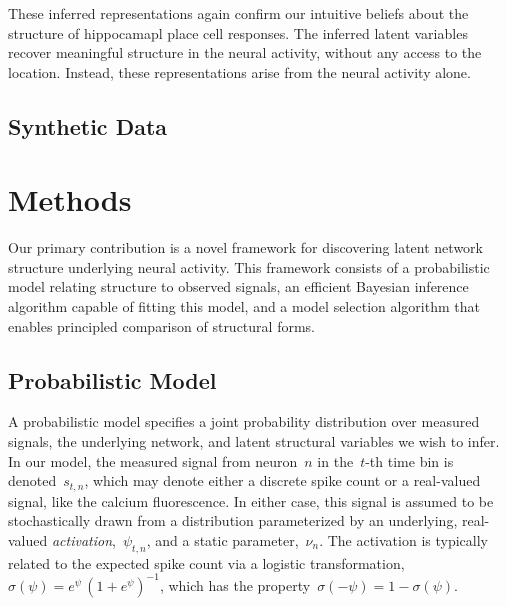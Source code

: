 These inferred representations again confirm our intuitive beliefs 
about the structure of hippocamapl place cell responses. The 
inferred latent variables recover meaningful structure in the
neural activity, without any access to the location. Instead, 
these representations arise from the neural activity alone.

\subsection{Synthetic Data}


\section{Methods}
\label{sec:methods}
Our primary contribution is a novel framework for discovering latent
network structure underlying neural activity.  This framework consists
of a probabilistic model relating structure to observed signals, an
efficient Bayesian inference algorithm capable of fitting this model,
and a model selection algorithm that enables principled comparison of
structural forms.

\subsection{Probabilistic Model}
A probabilistic model specifies a joint probability distribution over
measured signals, the underlying network, and latent structural
variables we wish to infer.  In our model, the measured signal from
neuron~$n$ in the~$t$-th time bin is denoted~$s_{t,n}$, which may 
denote either a discrete spike count or a real-valued signal, like 
the calcium fluorescence. In either case, this signal is assumed 
to be stochastically drawn from a distribution parameterized by 
an underlying, real-valued \emph{activation},~$\psi_{t,n}$,
and a static parameter,~$\nu_n$. The
activation is typically related to the expected spike count via
a logistic transformation,~$\sigma(\psi) = e^\psi \, (1+e^\psi)^{-1}$,
which has the property~$\sigma(-\psi) = 1-\sigma(\psi)$.

